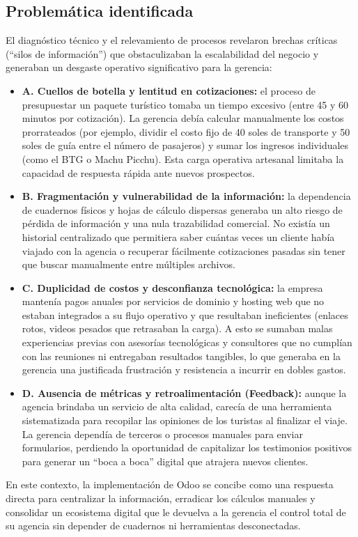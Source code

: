 \subsection{Problemática identificada}
\begin{indentedsubsection}
El diagnóstico técnico y el relevamiento de procesos revelaron brechas críticas (``silos de información'') que obstaculizaban la escalabilidad del negocio y generaban un desgaste operativo significativo para la gerencia:

\begin{itemize}
    \item \textbf{A. Cuellos de botella y lentitud en cotizaciones:} el proceso de presupuestar un paquete turístico tomaba un tiempo excesivo (entre 45 y 60 minutos por cotización). La gerencia debía calcular manualmente los costos prorrateados (por ejemplo, dividir el costo fijo de 40 soles de transporte y 50 soles de guía entre el número de pasajeros) y sumar los ingresos individuales (como el BTG o Machu Picchu). Esta carga operativa artesanal limitaba la capacidad de respuesta rápida ante nuevos prospectos.
    \item \textbf{B. Fragmentación y vulnerabilidad de la información:} la dependencia de cuadernos físicos y hojas de cálculo dispersas generaba un alto riesgo de pérdida de información y una nula trazabilidad comercial. No existía un historial centralizado que permitiera saber cuántas veces un cliente había viajado con la agencia o recuperar fácilmente cotizaciones pasadas sin tener que buscar manualmente entre múltiples archivos.
    \item \textbf{C. Duplicidad de costos y desconfianza tecnológica:} la empresa mantenía pagos anuales por servicios de dominio y hosting web que no estaban integrados a su flujo operativo y que resultaban ineficientes (enlaces rotos, videos pesados que retrasaban la carga). A esto se sumaban malas experiencias previas con asesorías tecnológicas y consultores que no cumplían con las reuniones ni entregaban resultados tangibles, lo que generaba en la gerencia una justificada frustración y resistencia a incurrir en dobles gastos.
    \item \textbf{D. Ausencia de métricas y retroalimentación (Feedback):} aunque la agencia brindaba un servicio de alta calidad, carecía de una herramienta sistematizada para recopilar las opiniones de los turistas al finalizar el viaje. La gerencia dependía de terceros o procesos manuales para enviar formularios, perdiendo la oportunidad de capitalizar los testimonios positivos para generar un ``boca a boca'' digital que atrajera nuevos clientes.
\end{itemize}

En este contexto, la implementación de Odoo se concibe como una respuesta directa para centralizar la información, erradicar los cálculos manuales y consolidar un ecosistema digital que le devuelva a la gerencia el control total de su agencia sin depender de cuadernos ni herramientas desconectadas.
\end{indentedsubsection}
